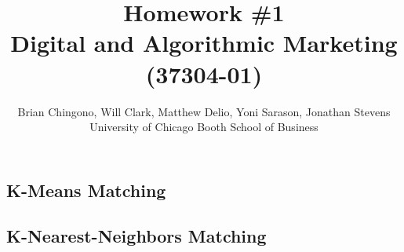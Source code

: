 \documentclass{article}
\begin{document}
\title{Homework \#1\\Digital and Algorithmic Marketing (37304-01)}
\author{Brian Chingono, Will Clark, Matthew Delio, Yoni Sarason, Jonathan Stevens\\University of Chicago Booth School of Business}

\maketitle

\section{} %

\subsection{K-Means Matching}

\subsection{K-Nearest-Neighbors Matching}

\section{} %
\end{document}
